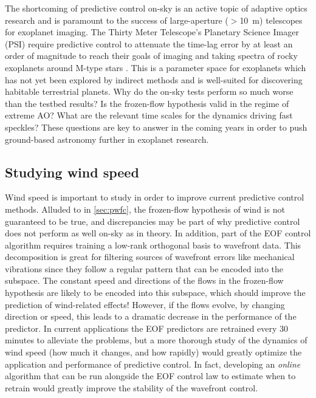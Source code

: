 The shortcoming of predictive control on-sky is an active topic of adaptive optics research \citep{2018ARA&A..56..315G} and is paramount to the success of large-aperture ($>$\SI{10}{\meter}) telescopes for exoplanet imaging. The Thirty Meter Telescope's Planetary Science Imager (PSI) require predictive control to attenuate the time-lag error by at least an order of magnitude to reach their goals of imaging and taking spectra of rocky exoplanets around M-type stars \citep{2018SPIE10703E..0ZG}. This is a parameter space for exoplanets which has not yet been explored by indirect methods and is well-suited for discovering habitable terrestrial planets. Why do the on-sky tests perform so much worse than the testbed results? Is the frozen-flow hypothesis valid in the regime of extreme AO? What are the relevant time scales for the dynamics driving fast speckles? These questions are key to answer in the coming years in order to push ground-based astronomy further in exoplanet research.

\subsection{Studying wind speed}\label{sec:windspeed}

Wind speed is important to study in order to improve current predictive control methods. Alluded to in \autoref{sec:pwfc}, the frozen-flow hypothesis of wind is not guaranteed to be true, and discrepancies may be part of why predictive control does not perform as well on-sky as in theory. In addition, part of the EOF control algorithm requires training a low-rank orthogonal basis to wavefront data. This decomposition is great for filtering sources of wavefront errors like mechanical vibrations since they follow a regular pattern that can be encoded into the subspace. The constant speed and directions of the flows in the frozen-flow hypothesis are likely to be encoded into this subspace, which should improve the prediction of wind-related effects! However, if the flows evolve, by changing direction or speed, this leads to a dramatic decrease in the performance of the predictor. In current applications the EOF predictors are retrained every 30 minutes to alleviate the problems, but a more thorough study of the dynamics of wind speed (how much it changes, and how rapidly) would greatly optimize the application and performance of predictive control. In fact, developing an \textit{online} algorithm that can be run alongside the EOF control law to estimate when to retrain would greatly improve the stability of the wavefront control.

